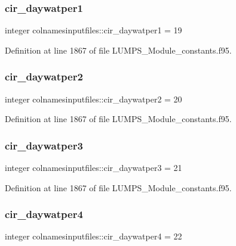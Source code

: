 \subsubsection{\texorpdfstring{cir\+\_\+daywatper1}{cir\_daywatper1}}
{\footnotesize\ttfamily integer colnamesinputfiles\+::cir\+\_\+daywatper1 = 19}



Definition at line 1867 of file L\+U\+M\+P\+S\+\_\+\+Module\+\_\+constants.\+f95.

\mbox{\label{namespacecolnamesinputfiles_a80dbec2d6698a9ca1109bf06273aea49}} 
\subsubsection{\texorpdfstring{cir\+\_\+daywatper2}{cir\_daywatper2}}
{\footnotesize\ttfamily integer colnamesinputfiles\+::cir\+\_\+daywatper2 = 20}



Definition at line 1867 of file L\+U\+M\+P\+S\+\_\+\+Module\+\_\+constants.\+f95.

\mbox{\label{namespacecolnamesinputfiles_aa686ddadbda26b6dd5198ef4f429e2ab}} 
\subsubsection{\texorpdfstring{cir\+\_\+daywatper3}{cir\_daywatper3}}
{\footnotesize\ttfamily integer colnamesinputfiles\+::cir\+\_\+daywatper3 = 21}



Definition at line 1867 of file L\+U\+M\+P\+S\+\_\+\+Module\+\_\+constants.\+f95.

\mbox{\label{namespacecolnamesinputfiles_a7cc2b6bb7cb07b32eca0c822a6ff2d17}} 
\subsubsection{\texorpdfstring{cir\+\_\+daywatper4}{cir\_daywatper4}}
{\footnotesize\ttfamily integer colnamesinputfiles\+::cir\+\_\+daywatper4 = 22}



